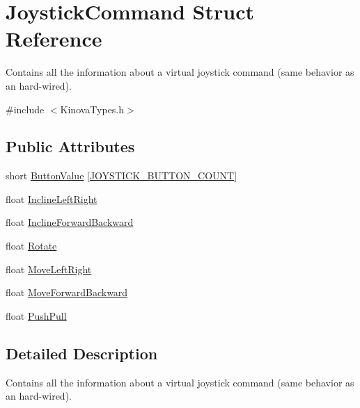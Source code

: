 \hypertarget{struct_joystick_command}{\section{Joystick\-Command Struct Reference}
\label{struct_joystick_command}
}


\par
Contains all the information about a virtual joystick command (same behavior as an hard-\/wired).  




{\ttfamily \#include $<$Kinova\-Types.\-h$>$}

\subsection*{Public Attributes}
\begin{DoxyCompactItemize}
\item 
short \hyperlink{struct_joystick_command_abe14f0b7b117048aa1c7f9626a669035}{Button\-Value} \mbox{[}\hyperlink{_kinova_types_8h_a3792c81f5808ad4f30000689ee0f0d07}{J\-O\-Y\-S\-T\-I\-C\-K\-\_\-\-B\-U\-T\-T\-O\-N\-\_\-\-C\-O\-U\-N\-T}\mbox{]}
\item 
float \hyperlink{struct_joystick_command_a357b7ffd95720084658487aee12662c8}{Incline\-Left\-Right}
\item 
float \hyperlink{struct_joystick_command_ac1ac2e83b68ea20eba3e92935b966ba6}{Incline\-Forward\-Backward}
\item 
float \hyperlink{struct_joystick_command_a02fece0bcf6cfc2135f294a3dbe9db4e}{Rotate}
\item 
float \hyperlink{struct_joystick_command_a6ca311d7940ce3c7ea6e9a3719388181}{Move\-Left\-Right}
\item 
float \hyperlink{struct_joystick_command_a9ca8ffe74ba1717de22528f71b0e5592}{Move\-Forward\-Backward}
\item 
float \hyperlink{struct_joystick_command_af530128a7a89e383f88a4c2b798a66b4}{Push\-Pull}
\end{DoxyCompactItemize}


\subsection{Detailed Description}
\par
Contains all the information about a virtual joystick command (same behavior as an hard-\/wired). 



